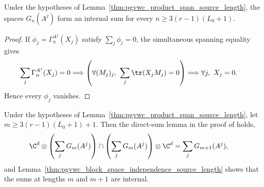 \begin{lemma}
    \label{thm:pgvwc_block_space_independence_source_length}
    \leanok
    Under the hypotheses of
    Lemma~\ref{thm:pgvwc_product_span_source_length}, the spaces $G_n(A^j)$
    form an internal sum for every $n\ge3(r-1)(L_0+1)$.
\end{lemma}

\begin{proof}
    \leanok
    If $\phi_j=\Gamma_n^{A^j}(X_j)$ satisfy
    $\sum_j\phi_j=0$, the simultaneous spanning equality gives
    \begin{align}
        \sum_j \Gamma_n^{A^j}(X_j)=0
         & \Longrightarrow
        \left(\forall (M_j)_j,\ \sum_j\tr(X_jM_j)=0\right)
        \Longrightarrow
        \forall j,\ X_j=0. \notag
    \end{align}
    Hence every $\phi_j$ vanishes.
\end{proof}

\begin{lemma}
    \label{thm:pgvwc_direct_sum_intersection_source_length}
    \leanok
    Under the hypotheses of
    Lemma~\ref{thm:pgvwc_product_span_source_length}, let
    $m\ge3(r-1)(L_0+1)+1$. Then the direct-sum lemma in the proof of
    \cite[Theorem~12, proof lines~1346--1456]{PerezGarcia2007Matrix} holds,
    \begin{align}
        \C^d\otimes\left(\sum_jG_m(A^j)\right)
        \cap
        \left(\sum_jG_m(A^j)\right)\otimes\C^d
         & =
        \sum_jG_{m+1}(A^j), \notag
    \end{align}
    and Lemma~\ref{thm:pgvwc_block_space_independence_source_length} shows
    that the sums at lengths $m$ and $m+1$ are internal.
\end{lemma}

